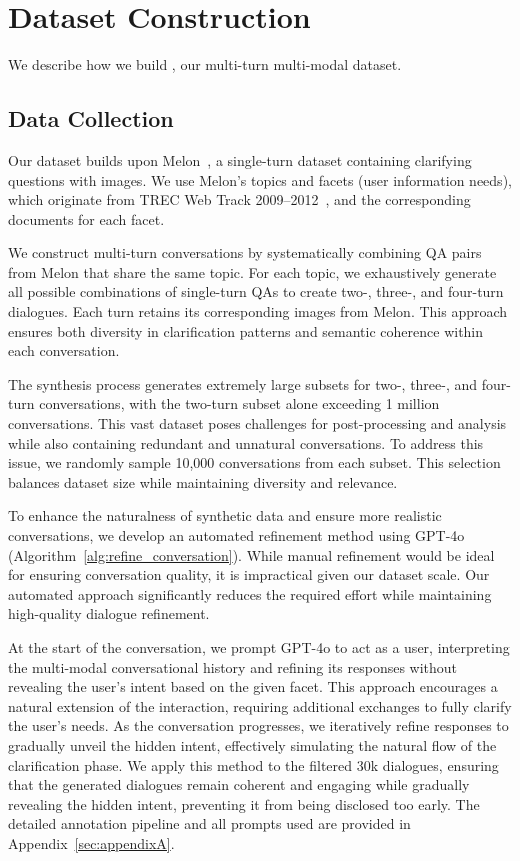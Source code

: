 \documentclass[11pt]{article}
\begin{document}
\section{Dataset Construction}
We describe how we build \OurData, our multi-turn multi-modal dataset.
\subsection{Data Collection}
Our dataset builds upon Melon~\cite{yuan2024askingmultimodalclarifyingquestions}, a single-turn dataset containing clarifying questions with images.
We use Melon's topics and facets (user information needs), which originate from TREC Web Track 2009–2012~\cite{trec2009,trec2012}, and the corresponding documents for each facet. 

We construct multi-turn conversations by systematically combining QA pairs from Melon that share the same topic. For each topic, we exhaustively generate all possible combinations of single-turn QAs to create two-, three-, and four-turn dialogues. Each turn retains its corresponding images from Melon. This approach ensures both diversity in clarification patterns and semantic coherence within each conversation.



The synthesis process generates extremely large subsets for two-, three-, and four-turn conversations, with the two-turn subset alone exceeding 1 million conversations. This vast dataset poses challenges for post-processing and analysis while also containing redundant and unnatural conversations. To address this issue, we randomly sample 10,000 conversations from each subset. This selection balances dataset size while maintaining diversity and relevance.

To enhance the naturalness of synthetic data and ensure more realistic conversations, we develop an automated refinement method using GPT-4o (Algorithm~\ref{alg:refine_conversation}). While manual refinement would be ideal for ensuring conversation quality, it is impractical given our dataset scale. Our automated approach significantly reduces the required effort while maintaining high-quality dialogue refinement.




At the start of the conversation, we prompt GPT-4o to act as a user, interpreting the multi-modal conversational history and refining its responses without revealing the user's intent based on the given facet. This approach encourages a natural extension of the interaction, requiring additional exchanges to fully clarify the user’s needs. As the conversation progresses, we iteratively refine responses to gradually unveil the hidden intent, effectively simulating the natural flow of the clarification phase.
We apply this method to the filtered 30k dialogues, ensuring that the generated dialogues remain coherent and engaging while gradually revealing the hidden intent, preventing it from being disclosed too early. The detailed annotation pipeline and all prompts used are provided in Appendix~\ref{sec:appendixA}.
\end{document}
